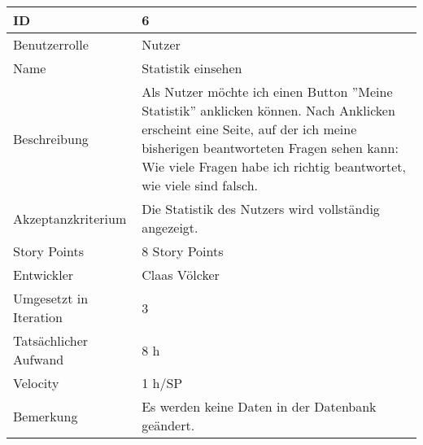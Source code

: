 \begin{tabularx}{\textwidth}{|p{}|X|}
	\hline
	ID & 6\\
	\hline
	Benutzerrolle & Nutzer\\
	\hline
	Name & Statistik einsehen\\
	\hline
	Beschreibung & Als Nutzer möchte ich einen Button ''Meine Statistik'' anklicken können. Nach Anklicken erscheint eine Seite, auf der ich meine bisherigen beantworteten Fragen sehen kann: Wie viele Fragen habe ich richtig beantwortet, wie viele sind falsch.\\
	\hline
	Akzeptanzkriterium & Die Statistik des Nutzers wird vollständig angezeigt.\\
	\hline
	Story Points & 8 Story Points\\
	\hline
	Entwickler & Claas Völcker\\
	\hline
	Umgesetzt in Iteration & 3\\
	\hline
	Tatsächlicher Aufwand & 8 h\\
	\hline
	Velocity & 1 h/SP\\
	\hline
	Bemerkung &  Es werden keine Daten in der Datenbank geändert.\\
	\hline
\end{tabularx}
\vspace{20pt}
